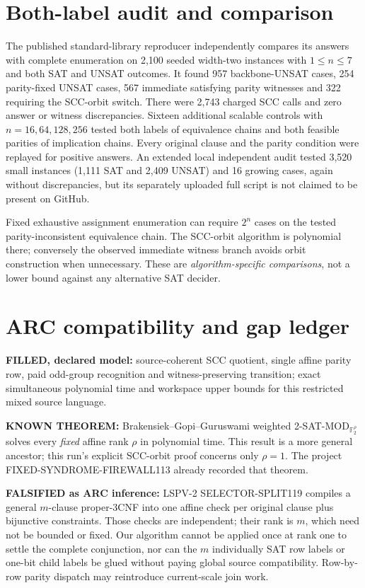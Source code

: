\documentclass[11pt]{article}
\begin{document}
\section{Both-label audit and comparison}
The published standard-library reproducer independently compares its answers with complete enumeration on 2,100 seeded width-two instances with $1\le n\le7$ and both SAT and UNSAT outcomes. It found 957 backbone-UNSAT cases, 254 parity-fixed UNSAT cases, 567 immediate satisfying parity witnesses and 322 requiring the SCC-orbit switch. There were 2,743 charged SCC calls and zero answer or witness discrepancies. Sixteen additional scalable controls with $n=16,64,128,256$ tested both labels of equivalence chains and both feasible parities of implication chains. Every original clause and the parity condition were replayed for positive answers. An extended local independent audit tested 3,520 small instances (1,111 SAT and 2,409 UNSAT) and 16 growing cases, again without discrepancies, but its separately uploaded full script is not claimed to be present on GitHub.

Fixed exhaustive assignment enumeration can require $2^n$ cases on the tested parity-inconsistent equivalence chain. The SCC-orbit algorithm is polynomial there; conversely the observed immediate witness branch avoids orbit construction when unnecessary. These are \emph{algorithm-specific comparisons}, not a lower bound against any alternative SAT decider.

\section{ARC compatibility and gap ledger}
\noindent\textbf{FILLED, declared model:} source-coherent SCC quotient, single affine parity row, paid odd-group recognition and witness-preserving transition; exact simultaneous polynomial time and workspace upper bounds for this restricted mixed source language.

\par\noindent\textbf{KNOWN THEOREM:} Brakensiek--Gopi--Guruswami weighted 2-SAT-MOD$_{\mathbb F_2^\rho}$ solves every \emph{fixed} affine rank $\rho$ in polynomial time. This result is a more general ancestor; this run's explicit SCC-orbit proof concerns only $\rho=1$. The project FIXED-SYNDROME-FIREWALL113 already recorded that theorem.

\par\noindent\textbf{FALSIFIED as ARC inference:} LSPV-2 SELECTOR-SPLIT119 compiles a general $m$-clause proper-3CNF into one affine check per original clause plus bijunctive constraints. Those checks are independent; their rank is $m$, which need not be bounded or fixed. Our algorithm cannot be applied once at rank one to settle the complete conjunction, nor can the $m$ individually SAT row labels or one-bit child labels be glued without paying global source compatibility. Row-by-row parity dispatch may reintroduce current-scale join work.
\end{document}
